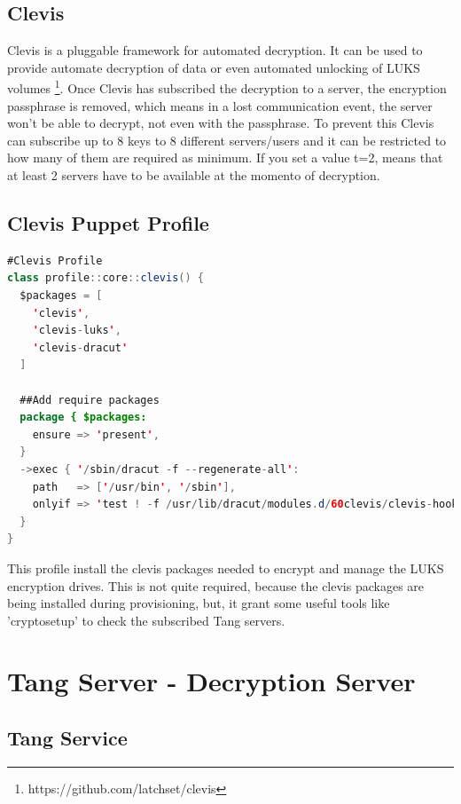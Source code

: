 \newpage
\subsection{Clevis}

Clevis is a pluggable framework for automated decryption. It can be used to provide automate decryption of data or even automated unlocking of LUKS volumes \footnote[2]{https://github.com/latchset/clevis}.
Once Clevis has subscribed the decryption to a server, the encryption passphrase is removed, which means in a lost communication event, the server won't be able to decrypt, not even with the passphrase. To prevent this Clevis can subscribe up to 8 keys to 8 different servers/users and it can be restricted to how many of them are required as minimum. If you set a value t=2, means that at least 2 servers have to be available at the momento of decryption.


\subsection{Clevis Puppet Profile}
\begin{lstlisting}[language=Java]
#Clevis Profile
class profile::core::clevis() {
  $packages = [
    'clevis',
    'clevis-luks',
    'clevis-dracut'
  ]

  ##Add require packages
  package { $packages:
    ensure => 'present',
  }
  ->exec { '/sbin/dracut -f --regenerate-all':
    path   => ['/usr/bin', '/sbin'],
    onlyif => 'test ! -f /usr/lib/dracut/modules.d/60clevis/clevis-hook.sh'
  }
}
\end{lstlisting}

This profile install the clevis packages needed to encrypt and manage the LUKS encryption drives. This is not quite required, because the clevis packages are being installed during provisioning, but, it grant some useful tools like 'cryptosetup' to check the subscribed Tang servers.

\newpage
\section{Tang Server - Decryption Server}

\subsection{Tang Service}

